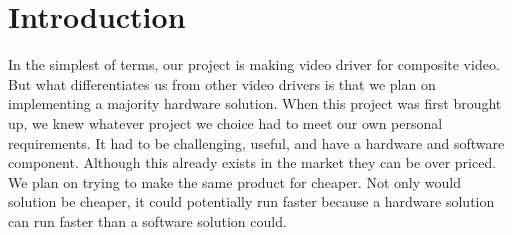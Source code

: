 \section{Introduction}

In the simplest of terms, our project is making video driver for composite
video. But what differentiates us from other video drivers is that we plan on 
implementing a majority hardware solution. When this project was first 
brought up, we knew whatever project we choice had to meet our own personal
requirements. It had to be challenging, useful, and have a hardware and 
software component. Although this already exists in the market they can be over
priced. We plan on trying to make the same product for cheaper. Not only would
solution be cheaper, it could potentially run faster because a hardware solution
can run faster than a software solution could.

